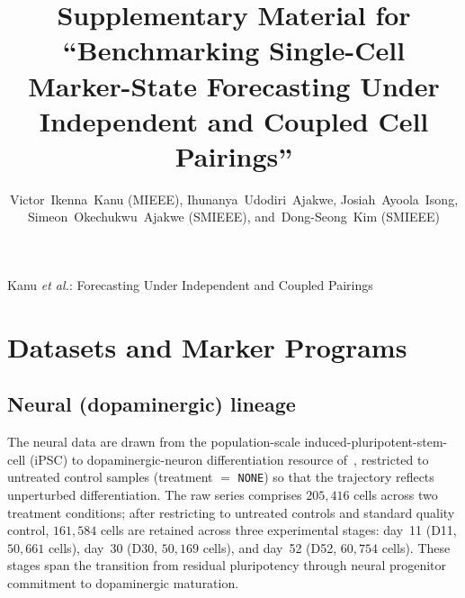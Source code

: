 \documentclass[10pt,journal,compsoc]{IEEEtran}
\begin{document}
\title{Supplementary Material for\\ ``Benchmarking Single-Cell Marker-State Forecasting Under Independent and Coupled Cell Pairings''}

\author{Victor~Ikenna~Kanu (MIEEE),
        Ihunanya~Udodiri~Ajakwe,
        Josiah~Ayoola~Isong,
        Simeon~Okechukwu~Ajakwe (SMIEEE),
        and~Dong-Seong~Kim (SMIEEE)}

%
{Kanu \MakeLowercase{\textit{et al.}}: Forecasting Under Independent and Coupled Pairings}

\maketitle

\section{Datasets and Marker Programs}
\label{sup:data}

\subsection{Neural (dopaminergic) lineage}
The neural data are drawn from the population-scale induced-pluripotent-stem-cell (iPSC) to dopaminergic-neuron differentiation resource of~\cite{jerber2021population}, restricted to untreated control samples (treatment $=$ \texttt{NONE}) so that the trajectory reflects unperturbed differentiation. The raw series comprises $205{,}416$ cells across two treatment conditions; after restricting to untreated controls and standard quality control, $161{,}584$ cells are retained across three experimental stages: day~11 (D11, $50{,}661$ cells), day~30 (D30, $50{,}169$ cells), and day~52 (D52, $60{,}754$ cells). These stages span the transition from residual pluripotency through neural progenitor commitment to dopaminergic maturation.
\end{document}
